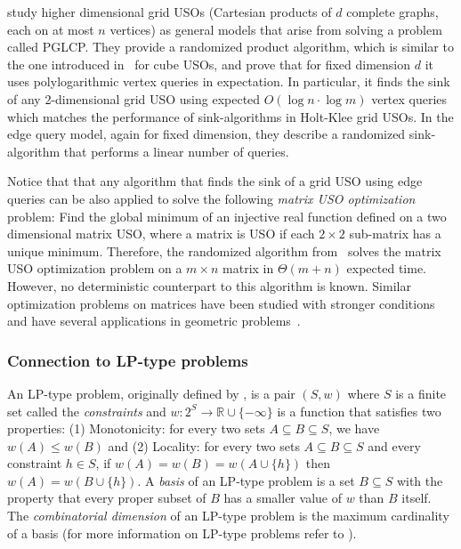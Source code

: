 \documentclass[runningheads,a4paper]{llncs}
\newcommand{\sinkalg}{sink-algorithm\xspace}
\newcommand{\sinkalgs}{sink-algorithms\xspace}
\begin{document}

\citet{grid08} study higher dimensional grid USOs (Cartesian products of $d$ complete graphs, each on at most $n$ vertices) as general models that arise from solving a problem called PGLCP. 
They provide a randomized product algorithm, which is similar to the one introduced in~\cite{SW} for cube USOs, and prove that for fixed dimension $d$ it uses polylogarithmic vertex queries in expectation. 
In particular, it finds the sink of any 2-dimensional grid USO using expected $O(\log n \cdot \log m)$ vertex queries which matches the performance of \sinkalgs in Holt-Klee grid USOs.
In the edge query model, again for fixed dimension, they describe a randomized \sinkalg that performs a linear number of queries.

Notice that that any algorithm that finds the sink of a grid USO using edge queries can be also applied to solve the following \emph{matrix USO optimization} problem: Find the global minimum of an injective real function defined on a two dimensional matrix USO, where a matrix is USO if each $2\times 2$ sub-matrix has a unique minimum. 
Therefore, the randomized algorithm from~\citet{grid08} solves the matrix USO optimization problem on a $m\times n$ matrix in $\Theta(m+n)$ expected time. However, no deterministic counterpart to this algorithm is known. 
Similar optimization problems on matrices have been studied with stronger conditions and have several applications in geometric problems~\cite{aggarwal1987geometric,demaine2005optimizing,galil1992dynamic,mityagin2003complexity}.

\subsubsection{Connection to LP-type problems}
An LP-type problem, originally defined by \citet{SharirW92}, is a pair $(S,w)$ where $S$ is a finite set called the \emph{constraints} and
$w:2^S \rightarrow \mathbb{R} \cup \{-\infty\}$ is a function 
that satisfies two properties: (1) Monotonicity: for every two sets $A \subseteq B \subseteq S$, we have $w(A) \leq w(B) $ and
(2) Locality: for every two sets $A \subseteq B \subseteq S$ and every constraint $h \in S$, if $w(A) = w(B) = w(A\cup \{h\})$ then 
$w(A) = w(B \cup \{h\})$.
A \emph{basis} of an LP-type problem is a set $B \subseteq S$ with the property that every proper subset
of $B$ has a smaller value of $w$ than $B$ itself. The \emph{combinatorial dimension} of an LP-type problem 
is the maximum cardinality of a basis (for more information on LP-type problems refer to \cite{MatousekSW96}).
\end{document}
